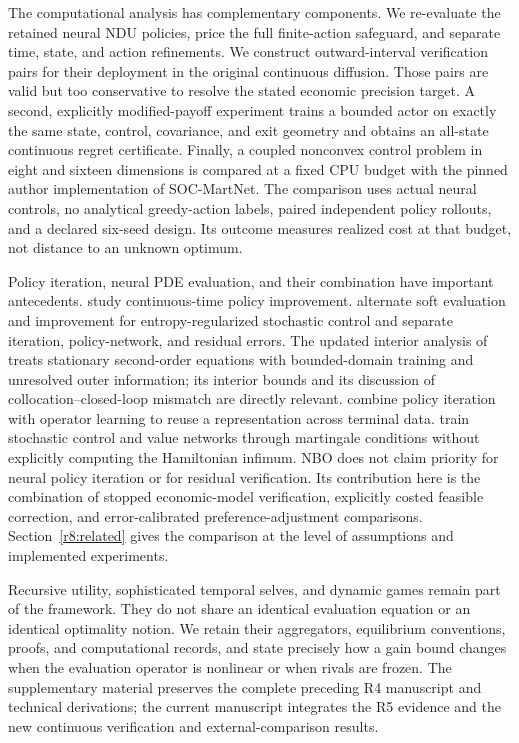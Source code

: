The computational analysis has complementary components. We re-evaluate the retained neural NDU policies, price the full finite-action safeguard, and separate time, state, and action refinements. We construct outward-interval verification pairs for their deployment in the original continuous diffusion. Those pairs are valid but too conservative to resolve the stated economic precision target. A second, explicitly modified-payoff experiment trains a bounded actor on exactly the same state, control, covariance, and exit geometry and obtains an all-state continuous regret certificate. Finally, a coupled nonconvex control problem in eight and sixteen dimensions is compared at a fixed CPU budget with the pinned author implementation of SOC-MartNet. The comparison uses actual neural controls, no analytical greedy-action labels, paired independent policy rollouts, and a declared six-seed design. Its outcome measures realized cost at that budget, not distance to an unknown optimum.

Policy iteration, neural PDE evaluation, and their combination have important antecedents. \citet{jacka2015} study continuous-time policy improvement. \citet{kim2026explore} alternate soft evaluation and improvement for entropy-regularized stochastic control and separate iteration, policy-network, and residual errors. The updated interior analysis of \citet{kim2026interior} treats stationary second-order equations with bounded-domain training and unresolved outer information; its interior bounds and its discussion of collocation--closed-loop mismatch are directly relevant. \citet{lee2025} combine policy iteration with operator learning to reuse a representation across terminal data. \citet{cai2025published} train stochastic control and value networks through martingale conditions without explicitly computing the Hamiltonian infimum. NBO does not claim priority for neural policy iteration or for residual verification. Its contribution here is the combination of stopped economic-model verification, explicitly costed feasible correction, and error-calibrated preference-adjustment comparisons. Section~\ref{r8:related} gives the comparison at the level of assumptions and implemented experiments.

Recursive utility, sophisticated temporal selves, and dynamic games remain part of the framework. They do not share an identical evaluation equation or an identical optimality notion. We retain their aggregators, equilibrium conventions, proofs, and computational records, and state precisely how a gain bound changes when the evaluation operator is nonlinear or when rivals are frozen. The supplementary material preserves the complete preceding R4 manuscript and technical derivations; the current manuscript integrates the R5 evidence and the new continuous verification and external-comparison results.

